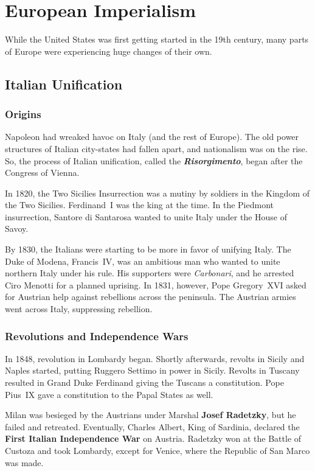 \chapter{European Imperialism}

While the United States was first getting started in the 19th century,
many parts of Europe were experiencing huge changes of their own.

\section{Italian Unification}

\subsection*{Origins}

Napoleon had wreaked havoc on Italy (and the rest of Europe).
The old power structures of Italian city-states had fallen apart, and nationalism was on the rise.
So, the process of Italian unification, called the \textbf{\textit{Risorgimento}}, began after the Congress of Vienna.

In 1820, the Two Sicilies Insurrection was a mutiny by soldiers in the Kingdom of the Two Sicilies.
Ferdinand~I was the king at the time.
In the Piedmont insurrection, Santore di Santarosa wanted to unite Italy under the House of Savoy.

By 1830, the Italians were starting to be more in favor of unifying Italy.
The Duke of Modena, Francis~IV, was an ambitious man who wanted to unite northern Italy under his rule.
His supporters were \textit{Carbonari}, and he arrested Ciro Menotti for a planned uprising.
In 1831, however, Pope Gregory~XVI asked for Austrian help against rebellions across the peninsula.
The Austrian armies went across Italy, suppressing rebellion.

\subsection*{Revolutions and Independence Wars}

In 1848, revolution in Lombardy began.
Shortly afterwards, revolts in Sicily and Naples started, putting Ruggero Settimo in power in Sicily.
Revolts in Tuscany resulted in Grand Duke Ferdinand giving the Tuscans a constitution.
Pope Pius~IX gave a constitution to the Papal States as well.

Milan was besieged by the Austrians under Marshal \textbf{Josef Radetzky}, but he failed and retreated.
Eventually, Charles Albert, King of Sardinia, declared the \textbf{First Italian Independence War} on Austria.
Radetzky won at the Battle of Custoza and took Lombardy, except for Venice, where the Republic of San Marco was made.

